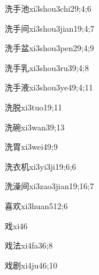 \begin{verbete}{洗手池}{xi3shou3chi2}{9;4;6}
\end{verbete}
\begin{verbete}{洗手间}{xi3shou3jian1}{9;4;7}
\end{verbete}
\begin{verbete}{洗手盆}{xi3shou3pen2}{9;4;9}
\end{verbete}
\begin{verbete}{洗手乳}{xi3shou3ru3}{9;4;8}
\end{verbete}
\begin{verbete}{洗手液}{xi3shou3ye4}{9;4;11}
\end{verbete}
\begin{verbete}{洗脱}{xi3tuo1}{9;11}
\end{verbete}
\begin{verbete}{洗碗}{xi3wan3}{9;13}
\end{verbete}
\begin{verbete}{洗胃}{xi3wei4}{9;9}
\end{verbete}
\begin{verbete}{洗衣机}{xi3yi3ji1}{9;6;6}
\end{verbete}
\begin{verbete}{洗澡间}{xi3zao3jian1}{9;16;7}
\end{verbete}
\begin{verbete}{喜欢}{xi3huan5}{12;6}
\end{verbete}
\begin{verbete}{戏}{xi4}{6}
\end{verbete}
\begin{verbete}{戏法}{xi4fa3}{6;8}
\end{verbete}
\begin{verbete}{戏剧}{xi4ju4}{6;10}
\end{verbete}
